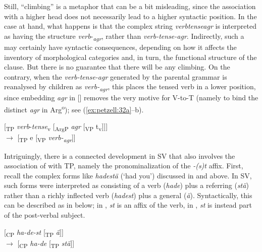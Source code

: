 \documentclass[output=paper,colorlinks,citecolor=brown,draft,draftmode]{langscibook}
\begin{document}
Still, “climbing” is a metaphor that can be a bit misleading, since the association with a higher head does not necessarily lead to a higher syntactic position. In the case at hand, what happens is that the complex string \textit{verbtenseagr} is interpreted as having the structure \textit{verb}\nobreakdash-\textit{\textsubscript{agr}}, rather than \textit{verb-tense-agr}. Indirectly, such a  may certainly have syntactic consequences, depending on how it affects the inventory of morphological categories and, in turn, the functional structure of the clause. But there is no guarantee that there will be any climbing. On the contrary, when the \textit{verb-tense-agr} generated by the parental grammar is reanalysed by children as \textit{verb-\textsubscript{agr}}, this places the tensed verb in a lower position, since embedding \textit{agr} in [] removes the very motive for V-to-T (namely to bind the distinct \textit{agr} in Arg\textsuperscript{o}); see (\ref{ex:petzell:32a}–b).


\ea\label{ex:petzell:32}
\ea\label{ex:petzell:32a}[\textsubscript{TP} \textit{verb}-\textit{tense}\textsubscript{v} [\textsubscript{ArgP} \textit{agr} [\textsubscript{VP} t\textsubscript{v}]]] \\
\ex\label{ex:petzell:32b}  $\to$ [\textsubscript{TP} e [\textsubscript{VP} \textit{verb-\textsubscript{agr}}]]
\z
\z


Intriguingly, there is a connected development in SV that also involves the association of  with TP, namely the pronominalization of the \textit{-(s)t} affix. First, recall the complex forms like \textit{hadestä} (‘had you’) discussed in  and  above. In SV, such forms were interpreted as consisting of a verb (\textit{hade}) plus a referring  (\textit{stä}) rather than a richly inflected verb (\textit{hadest}) plus a general  (\textit{ä}). Syntactically, this  can be described as in  below; in , \textit{st} is an affix of the verb, in , \textit{st} is instead part of the post-verbal subject.


\ea\label{ex:petzell:33}
\ea\label{ex:petzell:33a}  [\textsubscript{CP} \textit{ha-de-st} [\textsubscript{TP} \textit{ä}]]\\
\ex\label{ex:petzell:33b}{}  $\to$ [\textsubscript{CP} \textit{ha-de} [\textsubscript{TP} \textit{stä}]]
\z
\z
\end{document}
